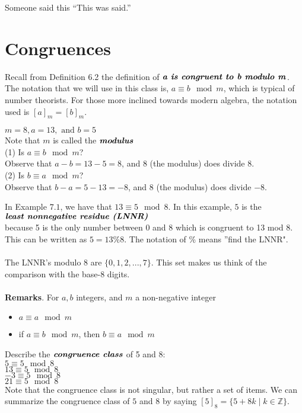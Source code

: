 \begin{chapquote}{Someone said this}
``This was said.''
\end{chapquote}

\section{Congruences}

Recall from Definition 6.2 the definition of $\textbf{\textit{a is congruent to b modulo m}}{}$. The notation that we will use in this class is, $a \equiv b \mod{m}$, which is typical of number theorists. For those more inclined towards modern algebra, the notation used is $[a]_m = [b]_m$.

\begin{example}
$m= 8, a = 13, \text{ and } b = 5$ \\ Note that $m$ is called the $\textbf{\textit{modulus}}{}$ \\ (1) Is $a \equiv b \mod{m}$? \\ \indent Observe that $a - b = 13 - 5 = 8$, and $8$ (the modulus) does divide $8$. \\
(2) Is $b \equiv a \mod{m}$? \\ 
\indent Observe that $b - a = 5 - 13 = -8$, and $8$ (the modulus) does divide $-8$.
\end{example}

In Example $7.1$, we have that $13 \equiv 5 \mod{8}$. In this example, $5$ is the $\textbf{\textit{least nonnegative residue (LNNR)}}{}$ \\ because 5 is the only number between 0 and 8 which is congruent to 13 mod 8. This can be written as $5 = 13 \% 8$. The notation of \% means ''find the LNNR".
\\
\\
The LNNR's modulo $8$ are $\{0, 1, 2, . . ., 7\}$. This set makes us think of the comparison with the base-8 digits.
\\
\\
\textbf{Remarks}. For $a, b$ integers, and $m$ a non-negative integer
\\
\begin{itemize}
\item $a \equiv a \mod{m}$
\item if $a \equiv b \mod{m}$, then $b \equiv a \mod{m}$
\end{itemize}

\begin{example}
Describe the $\textbf{\textit{congruence class}}{}$ of 5 and 8: \\
$5 \equiv 5 \mod{8}$ \\
$13 \equiv 5 \mod{8}$ \\
$-3 \equiv 5 \mod{8}$ \\
$21 \equiv 5 \mod{8}$ \\
Note that the congruence class is not singular, but rather a set of items. We can summarize the congruence class of $5$ and $8$ by saying $[5]_8 = \{ 5 + 8 k \mid k \in \mathbb{Z}\}$.
\end{example}

